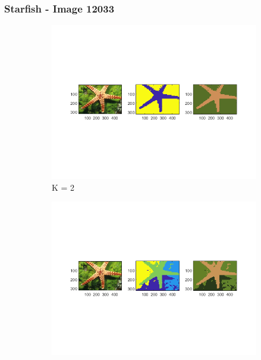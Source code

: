 \documentclass[12pt]{article}
\begin{document}
\subsubsection{Starfish - Image 12033}

\begin{figure}[H]
	\centering
	\begin{subfigure}[b]{0.475\textwidth}
		\centering
		\includegraphics[width=\textwidth]{figs/2-a-kmeans-1}
		\caption[]%
		{{\small K = 2}}    
		\label{fig:mean and std of net14}
	\end{subfigure}
	\hfill
	\begin{subfigure}[b]{0.475\textwidth}  
		\centering 
		\includegraphics[width=\textwidth]{figs/2-a-kmeans-1-k4}

\end{subfigure}
\end{figure}
\end{document}
